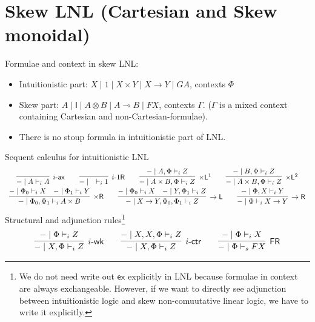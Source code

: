 \documentclass{article}
\newcommand{\ax}{\mathsf{ax}}
\newcommand{\ot}{\otimes}
\newcommand{\lolli}{\multimap}
\newcommand{\I}{\mathsf{I}}
\newcommand{\fr}{\mathsf{FR}}
\newcommand{\td}{\text{-}}
\newcommand{\tms}{\times}
\newcommand{\tmsr}{\times \mathsf{R}}
\newcommand{\tmslf}{\times \mathsf{L}^{1}}
\newcommand{\tmsls}{\times \mathsf{L}^{2}}
\newcommand{\rar}{\rightarrow}
\newcommand{\rarr}{\rightarrow \mathsf{R}}
\newcommand{\rarl}{\rightarrow \mathsf{L}}
\newcommand{\wk}{\mathsf{wk}}
\newcommand{\ctr}{\mathsf{ctr}}
\newcommand{\ex}{\mathsf{ex}}
\begin{document}
  \section*{Skew LNL (Cartesian and Skew monoidal)}
  Formulae and context in skew LNL:
  \begin{itemize}
    \item Intuitionistic part: $X \mid 1 \mid X \times Y \mid X \rightarrow Y \mid GA$, contexts $\Phi$
    \item Skew part: $A \mid \I \mid A \ot B \mid A \lolli B \mid FX$, contexts $\Gamma$. ($\Gamma$ is a mixed context containing Cartesian and non-Cartesian-formulae).
    \item There is no stoup formula in intuitionistic part of LNL.
  \end{itemize}
  Sequent calculus for intuitionistic LNL
  \begin{displaymath}
    \begin{array}{cc}
      \infer[i\td\ax]{- \mid A \vdash_{i} A}{}
      \qquad
      \infer[i\td 1\mathsf{R}]{- \mid \quad \vdash_{i} 1}{}
      \qquad
      \infer[\tmslf]{- \mid A \tms B , \Phi \vdash_{i} Z}{- \mid A,  \Phi \vdash_{i} Z}
      \qquad
      \infer[\tmsls]{- \mid A \tms B , \Phi \vdash_{i} Z}{- \mid B,  \Phi \vdash_{i} Z}
      \\
      \infer[\tmsr]{- \mid \Phi_{0} , \Phi_{1} \vdash_{i} A \tms B}{
       \deduce{- \mid \Phi_{0} \vdash_{i} X}{}
       &
       \deduce{- \mid \Phi_{1} \vdash_{i} Y}{}
      }
      \qquad
      \infer[\rarl]{- \mid X \rar Y , \Phi_{0} , \Phi_{1} \vdash_{i} Z}{
       \deduce{- \mid \Phi_{0} \vdash_{i} X}{}
       &
       \deduce{- \mid Y , \Phi_{1} \vdash_{i} Z}{}
      }
      \qquad
      \infer[\rarr]{- \mid \Phi \vdash_{i} X \rar Y}{- \mid \Phi , X \vdash_{i} Y}
    \end{array}
  \end{displaymath}
  Structural and adjunction rules\footnote{We do not need write out $\ex$ explicitly in LNL because formulae in context are always exchangeable. However, if we want to directly see adjunction between intuitionistic logic and skew non-comuutative linear logic, we have to write it explicitly.}
  \begin{displaymath}
    \begin{array}{cc}
    \infer[i\td\wk]{- \mid X, \Phi \vdash_{i} Z}{- \mid \Phi \vdash_{i} Z}
    \qquad
    \infer[i\td\ctr]{- \mid X , \Phi \vdash_{i} Z}{- \mid X , X , \Phi \vdash_{i} Z}
    \qquad
    \infer[\fr]{- \mid \Phi \vdash_{s} F X}{- \mid \Phi \vdash_{i} X}
    \end{array}
  \end{displaymath}
\end{document}
